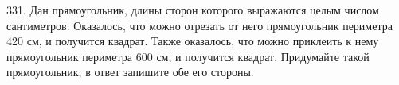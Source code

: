 331. Дан прямоугольник, длины сторон которого выражаются целым числом сантиметров. Оказалось, что можно отрезать от него прямоугольник периметра 420 см, и получится квадрат. Также оказалось, что можно приклеить к нему прямоугольник периметра 600 см, и получится квадрат. Придумайте такой прямоугольник, в ответ запишите обе его стороны.\\
